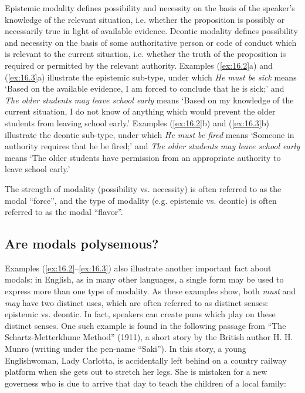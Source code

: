 Epistemic modality defines possibility and necessity on the basis of the speaker’s knowledge of the relevant situation, i.e. whether the proposition is possibly or necessarily true in light of available evidence. Deontic modality defines possibility and necessity on the basis of some authoritative person or code of conduct which is relevant to the current situation, i.e. whether the truth of the proposition is required or permitted by the relevant authority. Examples (\ref{ex:16.2}a) and (\ref{ex:16.3}a) illustrate the epistemic sub-type, under which \textit{He must be sick} means ‘Based on the available evidence, I am forced to conclude that he is sick;’ and \textit{The older students may leave school early} means ‘Based on my knowledge of the current situation, I do not know of anything which would prevent the older students from leaving school early.’ Examples (\ref{ex:16.2}b) and (\ref{ex:16.3}b) illustrate the deontic sub-type, under which \textit{He must be fired} means ‘Someone in authority requires that he be fired;’ and \textit{The older students may leave school early} means ‘The older students have permission from an appropriate authority to leave school early.’



The strength of modality (possibility vs. necessity) is often referred to as the modal “force”, and the type of modality (e.g. epistemic vs. deontic) is often referred to as the modal “flavor”.


\subsection{Are modals polysemous?}\label{sec:16.2.1}

Examples (\ref{ex:16.2}--\ref{ex:16.3}) also illustrate another important fact about modals: in English, as in many other languages, a single form may be used to express more than one type of modality. As these examples show, both \textit{must} and \textit{may} have two distinct uses, which are often referred to as distinct senses: epistemic vs. deontic. In fact, speakers can create puns which play on these distinct senses. One such example is found in the following passage from “The Schartz-Metterklume Method” (1911), a short story by the British author H. H. Munro (writing under the pen-name “Saki”). In this story, a young Englishwoman, Lady Carlotta, is accidentally left behind on a country railway platform when she gets out to stretch her legs. She is mistaken for a new governess who is due to arrive that day to teach the children of a local family:


